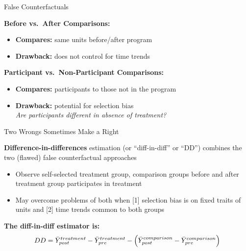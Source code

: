 \documentclass[10pt,xcolor=table,ignorenonframetext,handout,aspectratio=169]{beamer}
\newlength{\wideitemsep}
\let\olditem\item
\renewcommand{\item}{\setlength{\itemsep}{\wideitemsep}\olditem}
\begin{document}
\begin{frame}{False Counterfactuals}

\medskip
\textbf{Before vs.~After Comparisons:}

\medskip
\begin{itemize}
	
	\item
	\textbf{Compares:} same units before/after program
	
	\item
	\textbf{Drawback:} does not control for time trends
	
\end{itemize}

\medskip
\textbf{Participant vs.~Non-Participant Comparisons:}

\medskip
\begin{itemize}
	
	\item
	\textbf{Compares:} participants to those not in the program
	
	\item
	\textbf{Drawback:} potential for selection bias \\
	\emph{Are participants different in absence of treatment?}
	
\end{itemize}

\end{frame}



\begin{frame}{Two Wrongs Sometimes Make a Right}

\medskip

\textbf{Difference-in-differences} estimation (or ``diff-in-diff'' or ``DD'') combines the two (flawed) false counterfactual approaches

\medskip
\begin{itemize}
	
	\item Observe self-selected treatment group, comparison groups before and after treatment group participates in treatment
	
	\item May overcome problems of both when [1] selection bias is on fixed traits of units and [2] time trends common to both groups

	
\end{itemize}

\pause
\medskip
\medskip

\textbf{The diff-in-diff estimator is:}
\begin{equation*}
DD = \textcolor{black}{\bar{Y}^{treatment}_{post} - \bar{Y}^{treatment}_{pre}} - \left( \textcolor{black}{\bar{Y}^{comparison}_{post} - \bar{Y}^{comparison}_{pre}}  \right)
\end{equation*}

\end{frame}
\end{document}
